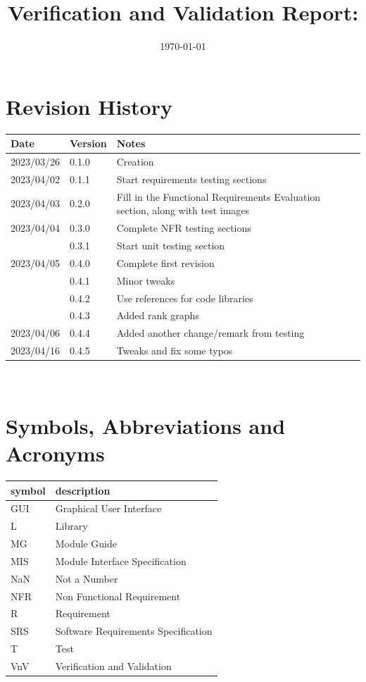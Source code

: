 \documentclass[12pt, titlepage]{article}
\begin{document}
\title{Verification and Validation Report: \progname} 
\author{\authname}
\date{\today}
	
\maketitle


\section{Revision History}

\begin{tabularx}{\textwidth}{p{3cm}p{2cm}X}
\toprule {\bf Date} & {\bf Version} & {\bf Notes}\\
\midrule
2023/03/26 & 0.1.0 & Creation\\
2023/04/02 & 0.1.1 & Start requirements testing sections\\
2023/04/03 & 0.2.0 & Fill in the Functional Requirements Evaluation
  section, along with test images\\
2023/04/04 & 0.3.0 & Complete NFR testing sections\\
           & 0.3.1 & Start unit testing section\\
2023/04/05 & 0.4.0 & Complete first revision\\
           & 0.4.1 & Minor tweaks\\
           & 0.4.2 & Use references for code libraries\\
           & 0.4.3 & Added rank graphs\\
2023/04/06 & 0.4.4 & Added another change/remark from testing\\
2023/04/16 & 0.4.5 & Tweaks and fix some typos\\
\bottomrule
\end{tabularx}

~\newpage

\section{Symbols, Abbreviations and Acronyms}

\renewcommand{\arraystretch}{1.2}
\begin{tabular}{l l} 
  \toprule		
  \textbf{symbol} & \textbf{description}\\
  \midrule 
  GUI & Graphical User Interface\\
  L & Library\\
  MG & Module Guide\\
  MIS & Module Interface Specification\\
  NaN & Not a Number\\
  NFR & Non Functional Requirement\\
  R & Requirement\\
  SRS & Software Requirements Specification\\
  T & Test\\
  VnV & Verification and Validation\\
  \bottomrule
\end{tabular}\\
\end{document}
